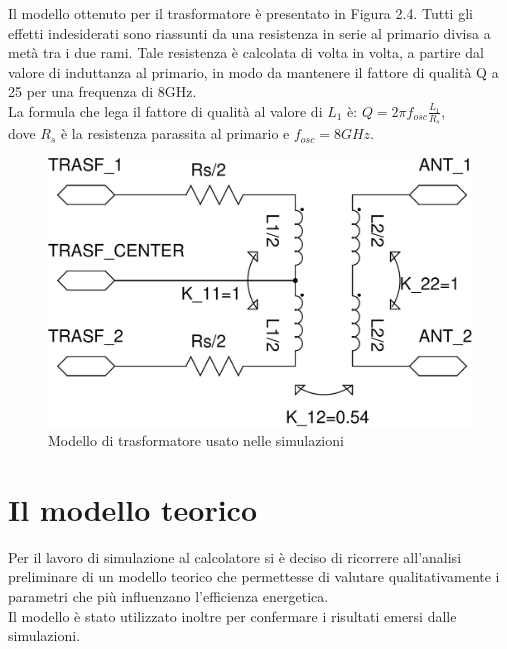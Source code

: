 \documentclass[a4paper, 12pt]{memoir}
\begin{document}
Il modello ottenuto per il trasformatore è presentato in Figura 2.4.
Tutti gli effetti indesiderati sono riassunti da una resistenza in serie al
primario divisa a metà tra i due rami. Tale resistenza è calcolata di volta in
volta, a partire dal valore di induttanza al primario, in modo da mantenere il
fattore di qualità Q a 25 per una frequenza di 8GHz.\\
La formula che lega il fattore di qualità al valore di $L_1$ è:
$ Q = 2\pi f_{osc} \frac{L_1}{R_s} $,\\
dove $R_s$ è la resistenza parassita al primario e $ f_{osc}=8GHz $.
\vfill
\begin{figure}[h]
\centering
\includegraphics[height=0.32\textheight]{images/trasf_model.pdf}
\caption{Modello di trasformatore usato nelle simulazioni}
\end{figure}
\clearpage %

\section{Il modello teorico}
Per il lavoro di simulazione al calcolatore si è deciso di ricorrere 
all'analisi preliminare di un modello teorico che permettesse di valutare
qualitativamente i parametri che più influenzano l'efficienza energetica.\\
Il modello è stato utilizzato inoltre per confermare i risultati emersi dalle
simulazioni.
\end{document}
